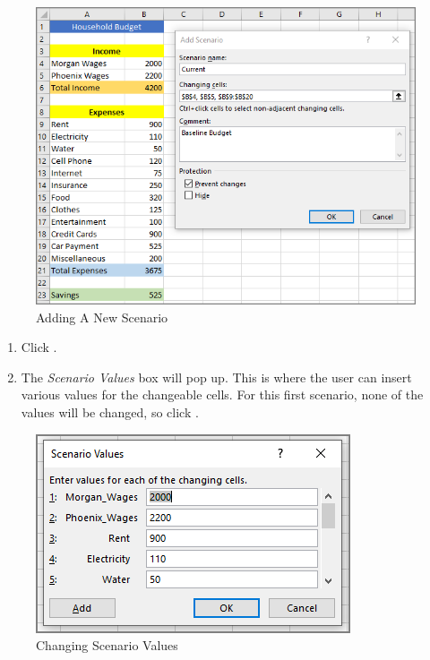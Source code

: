 \begin{figure}[H]
	\centering
	\includegraphics[width=\maxwidth{.95\linewidth}]{gfx/ch08_fig51}
	\caption{Adding A New Scenario}
	\label{08:fig51}
\end{figure}

\begin{enumerate}[resume]

	\item Click .
	\item The \textit{Scenario Values} box will pop up. This is where the user can insert various values for the changeable cells. For this first scenario, none of the values will be changed, so click .
	
\end{enumerate}

\begin{figure}[H]
	\centering
	\includegraphics[width=\maxwidth{.75\linewidth}]{gfx/ch08_fig52}
	\caption{Changing Scenario Values}
	\label{08:fig52}
\end{figure}

